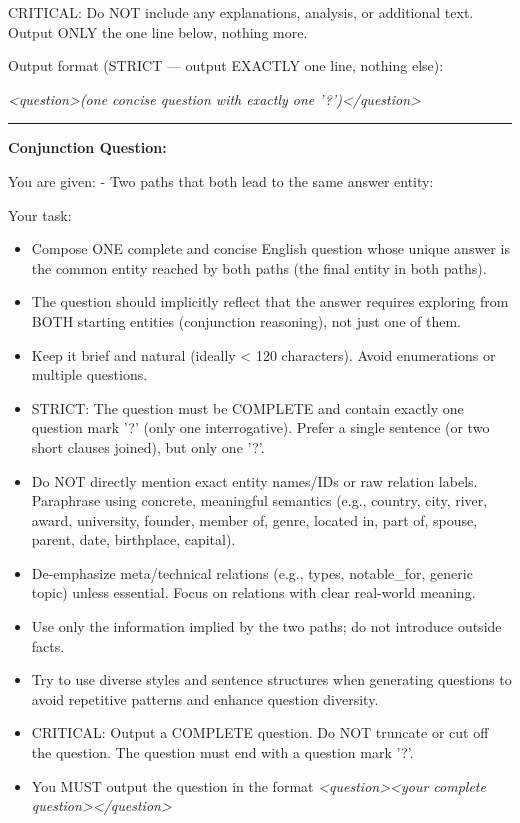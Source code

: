 \begin{tcolorbox}
CRITICAL: Do NOT include any explanations, analysis, or additional text. Output ONLY the one line below, nothing more.

Output format (STRICT --- output EXACTLY one line, nothing else):

\textcolor{green!70!black}{\textit{<question>}}\textit{(one concise question with exactly one '?')}\textcolor{green!70!black}{\textit{</question>}}

\vspace{0.5em}
\hrule
\vspace{0.3em}

\textbf{Conjunction Question:}

You are given:
- Two paths that both lead to the same answer entity:

Your task:
\begin{itemize}
  \item Compose ONE complete and concise English question whose unique answer is the common entity reached by both paths (the final entity in both paths).
  \item The question should implicitly reflect that the answer requires exploring from BOTH starting entities (conjunction reasoning), not just one of them.
  \item Keep it brief and natural (ideally < 120 characters). Avoid enumerations or multiple questions.
  \item STRICT: The question must be COMPLETE and contain exactly one question mark '?' (only one interrogative). Prefer a single sentence (or two short clauses joined), but only one '?'.
  \item Do NOT directly mention exact entity names/IDs or raw relation labels. Paraphrase using concrete, meaningful semantics (e.g., country, city, river, award, university, founder, member of, genre, located in, part of, spouse, parent, date, birthplace, capital).
  \item De-emphasize meta/technical relations (e.g., types, notable\_for, generic topic) unless essential. Focus on relations with clear real-world meaning.
  \item Use only the information implied by the two paths; do not introduce outside facts.
  \item Try to use diverse styles and sentence structures when generating questions to avoid repetitive patterns and enhance question diversity.
  \item CRITICAL: Output a COMPLETE question. Do NOT truncate or cut off the question. The question must end with a question mark '?'.
  \item You MUST output the question in the format \textcolor{green!70!black}{\textit{<question>}}\textit{<your complete question>}\textcolor{green!70!black}{\textit{</question>}}
\end{itemize}


\end{tcolorbox}
